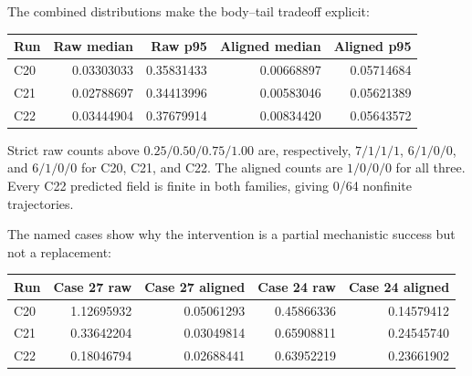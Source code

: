 \documentclass[11pt]{article}
\begin{document}
The combined distributions make the body--tail tradeoff explicit:
\begin{center}
\small
\begin{tabular}{lrrrr}
\toprule
Run & Raw median & Raw p95 & Aligned median & Aligned p95 \\
\midrule
C20 & 0.03303033 & 0.35831433 & 0.00668897 & 0.05714684 \\
C21 & 0.02788697 & 0.34413996 & 0.00583046 & 0.05621389 \\
C22 & 0.03444904 & 0.37679914 & 0.00834420 & 0.05643572 \\
\bottomrule
\end{tabular}
\end{center}
Strict raw counts above \(0.25/0.50/0.75/1.00\) are, respectively,
\(7/1/1/1\), \(6/1/0/0\), and \(6/1/0/0\) for C20, C21, and C22.  The aligned
counts are \(1/0/0/0\) for all three.  Every C22 predicted field is finite in
both families, giving 0/64 nonfinite trajectories.

The named cases show why the intervention is a partial mechanistic success but
not a replacement:
\begin{center}
\small
\begin{tabular}{lrrrr}
\toprule
Run & Case 27 raw & Case 27 aligned & Case 24 raw & Case 24 aligned \\
\midrule
C20 & 1.12695932 & 0.05061293 & 0.45866336 & 0.14579412 \\
C21 & 0.33642204 & 0.03049814 & 0.65908811 & 0.24545740 \\
C22 & 0.18046794 & 0.02688441 & 0.63952219 & 0.23661902 \\
\bottomrule
\end{tabular}
\end{center}
\end{document}
